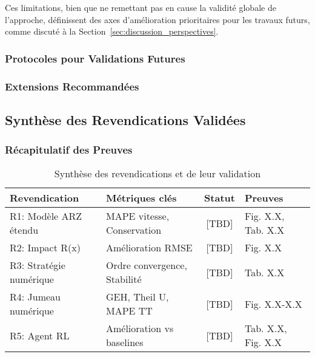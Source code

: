 Ces limitations, bien que ne remettant pas en cause la validité globale de l'approche, définissent des axes d'amélioration prioritaires pour les travaux futurs, comme discuté à la Section~\ref{sec:discussion_perspectives}.

\subsubsection{Protocoles pour Validations Futures}
\label{subsec:protocoles_futurs}

\subsubsection{Extensions Recommandées}
\label{subsec:extensions_recommandees}

\subsection{Synthèse des Revendications Validées}
\label{sec:synthese_revendications}

\subsubsection{Récapitulatif des Preuves}
\label{subsec:recapitulatif_preuves}

\begin{table}[htbp]
    \centering
    \caption{Synthèse des revendications et de leur validation}
    \label{tab:synthese_revendications}
    \begin{tabular}{|l|l|c|l|}
        \hline
        \textbf{Revendication}  & \textbf{Métriques clés}      & \textbf{Statut} & \textbf{Preuves}   \\
        \hline
        R1: Modèle ARZ étendu   & MAPE vitesse, Conservation   & [TBD]           & Fig. X.X, Tab. X.X \\
        R2: Impact R(x)         & Amélioration RMSE            & [TBD]           & Fig. X.X           \\
        R3: Stratégie numérique & Ordre convergence, Stabilité & [TBD]           & Tab. X.X           \\
        R4: Jumeau numérique    & GEH, Theil U, MAPE TT        & [TBD]           & Fig. X.X-X.X       \\
        R5: Agent RL            & Amélioration vs baselines    & [TBD]           & Tab. X.X, Fig. X.X \\
        \hline
    \end{tabular}
\end{table}

